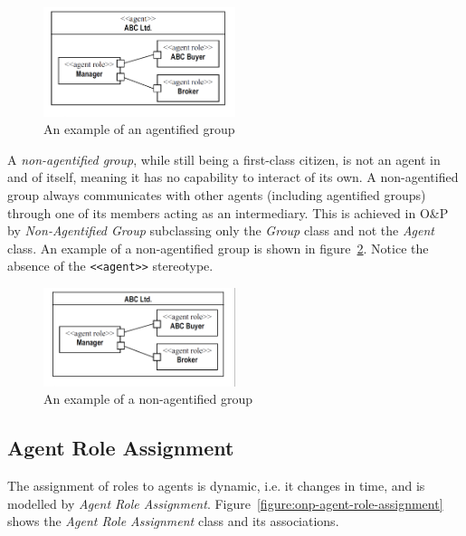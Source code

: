 \begin{figure}[ht]
	\centering
	\includegraphics[width=0.5\textwidth]{images/onp/agentified-group.png}
	\caption{An example of an agentified group}
	\label{figure:onp-agentified-group}
\end{figure}

A \textit{non-agentified group}, while still being a first-class citizen, is not an agent in and of itself, meaning it has no capability to interact of its own.
A non-agentified group always communicates with other agents (including agentified groups) through one of its members acting as an intermediary.
This is achieved in O\&P by \textit{Non-Agentified Group} subclassing only the \textit{Group} class and not the \textit{Agent} class.
An example of a non-agentified group is shown in figure~\ref{figure:onp-non-agentified-group}.
Notice the absence of the \texttt{<<agent>>} stereotype.

\begin{figure}[ht]
	\centering
	\includegraphics[width=0.5\textwidth]{images/onp/non-agentified-group.png}
	\caption{An example of a non-agentified group}
	\label{figure:onp-non-agentified-group}
\end{figure}

\subsection{Agent Role Assignment}

The assignment of roles to agents is dynamic, i.e. it changes in time, and is modelled by \textit{Agent Role Assignment}.
Figure~\ref{figure:onp-agent-role-assignment} shows the \textit{Agent Role Assignment} class and its associations.

